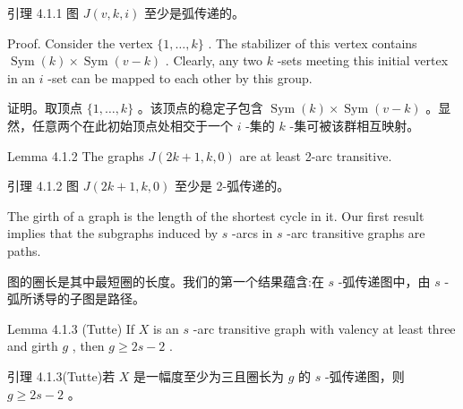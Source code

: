 \documentclass[10pt]{article}
\begin{document}
\begin{tcolorbox}\relax
引理 4.1.1 图 \(J\left( {v,k,i}\right)\) 至少是弧传递的。
\end{tcolorbox}

Proof. Consider the vertex \(\{ 1,\ldots ,k\}\) . The stabilizer of this vertex contains \(\operatorname{Sym}\left( k\right)  \times  \operatorname{Sym}\left( {v - k}\right)\) . Clearly, any two \(k\) -sets meeting this initial vertex in an \(i\) -set can be mapped to each other by this group.

\begin{tcolorbox}\relax
证明。取顶点 \(\{ 1,\ldots ,k\}\) 。该顶点的稳定子包含 \(\operatorname{Sym}\left( k\right)  \times  \operatorname{Sym}\left( {v - k}\right)\) 。显然，任意两个在此初始顶点处相交于一个 \(i\) -集的 \(k\) -集可被该群相互映射。
\end{tcolorbox}

Lemma 4.1.2 The graphs \(J\left( {{2k} + 1,k,0}\right)\) are at least 2-arc transitive.

\begin{tcolorbox}\relax
引理 4.1.2 图 \(J\left( {{2k} + 1,k,0}\right)\) 至少是 2-弧传递的。
\end{tcolorbox}

The girth of a graph is the length of the shortest cycle in it. Our first result implies that the subgraphs induced by \(s\) -arcs in \(s\) -arc transitive graphs are paths.

\begin{tcolorbox}\relax
图的圈长是其中最短圈的长度。我们的第一个结果蕴含:在 \(s\) -弧传递图中，由 \(s\) -弧所诱导的子图是路径。
\end{tcolorbox}

Lemma 4.1.3 (Tutte) If \(X\) is an \(s\) -arc transitive graph with valency at least three and girth \(g\) , then \(g \geq  {2s} - 2\) .

\begin{tcolorbox}\relax
引理 4.1.3(Tutte)若 \(X\) 是一幅度至少为三且圈长为 \(g\) 的 \(s\) -弧传递图，则 \(g \geq  {2s} - 2\) 。
\end{tcolorbox}
\end{document}
